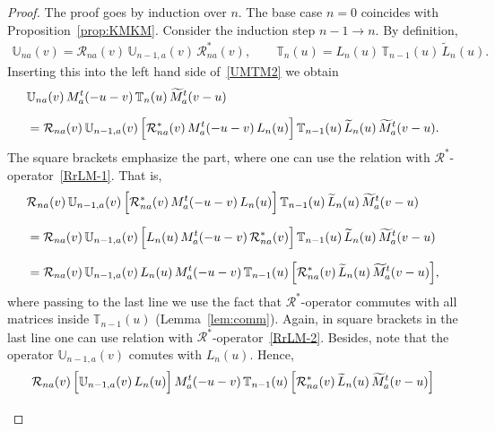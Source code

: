 \documentclass[11pt]{article}
\numberwithin{equation}{section}
\theoremstyle{plain}
\theoremstyle{definition}
\newcommand{\T}{\mathbb{T}}
\newcommand{\MMO}{\mathbb{U}}
\begin{document}
\begin{proof}
	The proof goes by induction over $n$. The base case $n = 0$ coincides with Proposition~\ref{prop:KMKM}. Consider the induction step $n - 1 \to n$. By definition,
	\begin{align}
		\MMO_{na}(v) = \mathcal{R}_{na}(v) \, \MMO_{n - 1 , a}(v) \, \mathcal{R}^*_{na}(v), \qquad \T_n(u) = L_n(u) \, \T_{n - 1}(u) \, \widetilde{L}_n(u).
	\end{align}
	Inserting this into the left hand side of~\eqref{UMTM2} we obtain
	\begin{align}
		\begin{aligned}
			& \MMO_{na}(v) \, M_a^t(- u - v) \, \T_n(u) \, \widetilde{M}^t_a(v - u) \\[6pt]
			& = \mathcal{R}_{na}(v) \, \MMO_{n - 1 , a}(v) \, \Bigl[ \mathcal{R}^*_{na}(v) \, M_a^t(- u - v) \, L_n(u) \Bigr] \, \T_{n - 1}(u) \, \widetilde{L}_n(u) \, \widetilde{M}^t_a(v - u).
		\end{aligned}
	\end{align}
	The square brackets emphasize the part, where one can use the relation with $\mathcal{R}^*$-operator~\eqref{RrLM-1}. That is,
	\begin{align}
		\begin{aligned}
			& \mathcal{R}_{na}(v) \, \MMO_{n - 1 , a}(v) \, \Bigl[ \mathcal{R}^*_{na}(v) \, M_a^t(- u - v) \, L_n(u) \Bigr] \, \T_{n - 1}(u) \, \widetilde{L}_n(u) \, \widetilde{M}^t_a(v - u) \\[6pt]
			& = \mathcal{R}_{na}(v) \, \MMO_{n - 1 , a}(v) \, \Bigl[ L_n(u) \, M_a^t(- u - v) \, \mathcal{R}^*_{na}(v) \Bigr] \, \T_{n - 1}(u) \, \widetilde{L}_n(u) \, \widetilde{M}^t_a(v - u)  \\[6pt]
			& = \mathcal{R}_{na}(v) \, \MMO_{n - 1 , a}(v) \, L_n(u) \, M_a^t(- u - v) \, \T_{n - 1}(u) \, \Bigl[ \mathcal{R}^*_{na}(v) \, \widetilde{L}_n(u) \, \widetilde{M}^t_a(v - u) \Bigr],
		\end{aligned}
	\end{align}
	where passing to the last line we use the fact that $\mathcal{R}^*$-operator commutes with all matrices inside $\T_{n - 1}(u)$ (Lemma~\ref{lem:comm}). Again, in square brackets in the last line one can use relation with $\mathcal{R}^*$-operator~\eqref{RrLM-2}. Besides, note that the operator $\MMO_{n - 1 , a}(v)$ comutes with $L_n(u)$. Hence, 
	\begin{align}
		\begin{aligned}
			& \mathcal{R}_{na}(v) \, \Bigl[ \MMO_{n - 1 , a}(v) \, L_n(u) \Bigr] \, M_a^t(- u - v) \, \T_{n - 1}(u) \, \Bigl[ \mathcal{R}^*_{na}(v) \, \widetilde{L}_n(u) \, \widetilde{M}^t_a(v - u) \Bigr] \\[6pt]

\end{aligned}
\end{align}
\end{proof}
\end{document}
